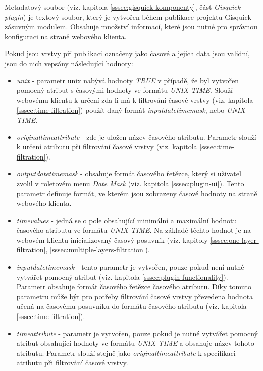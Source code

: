 Metadatový soubor (viz. kapitola \ref{sssec:gisquick-komponenty}, část
\textit{Gisquick plugin}) je textový soubor, který je vytvořen během publikace
projektu Gisquick zásuvným modulem. Obsahuje množství informací, které jsou
nutné pro správnou konfiguraci na straně webového klienta.

Pokud jsou vrstvy při publikaci označeny jako časové a jejich data jsou
validní, jsou do nich vepsány následující hodnoty:

\begin{itemize}
\item\textit{unix} - parametr unix nabývá hodnoty \textit{TRUE}
v případě, že byl vytvořen pomocný atribut s časovými
hodnoty ve formátu \textit{UNIX TIME}. Slouží webovému
klientu k určení zda-li má k filtrování časové vrstvy
(viz. kapitola \ref{sssec:time-filtration}) použít daný formát
\textit{input\textunderscore datetime\textunderscore mask}, nebo
\textit{UNIX TIME}.
\item\textit{original\textunderscore time\textunderscore attribute}
- zde je uložen název časového atributu. Parametr slouží k
určení atributu při filtrování časové vrstvy (viz. kapitola
\ref{sssec:time-filtration}).
\item\textit{output\textunderscore datetime\textunderscore mask}
- obsahuje formát časového řetězce, který si uživatel
zvolil v roletovém menu \textit{Date Mask} (viz. kapitola
\ref{sssec:plugin-ui}). Tento parametr definuje formát, ve kterém
jsou zobrazeny časové hodnoty na straně webového klienta.
\item\textit{time\textunderscore values} - jedná se o pole
obsahující minimální a maximální hodnotu časového
atributu ve formátu \textit{UNIX TIME}. Na základě těchto
hodnot je na webovém klientu inicializovaný časový
posuvník (viz. kapitoly \ref{sssec:one-layer-filtration},
\ref{sssec:multiple-layers-filtration}).
\item\textit{input\textunderscore datetime\textunderscore mask} - tento
parametr je vytvořen, pouze pokud není nutné vytvářet pomocný
atribut (viz. kapitola \ref{sssec:plugin-functionality}). Parametr
obsahuje formát časového řetězce časového
atributu. Díky tomuto parametru může být pro potřeby filtrování
časové vrstvy převedena hodnota učená na časovému posuvníku
do formátu časového atributu (viz. kapitola
\ref{sssec:time-filtration}).
\item\textit{time\textunderscore attribute} - parametr
je vytvořen, pouze pokud je nutné vytvářet pomocný
atribut obsahující hodnoty ve formátu \textit{UNIX TIME} a
obsahuje název tohoto atributu. Parametr slouží stejně jako
\textit{original\textunderscore time\textunderscore attribute}
k specifikaci atributu při filtrování časové vrstvy.
\end{itemize}

